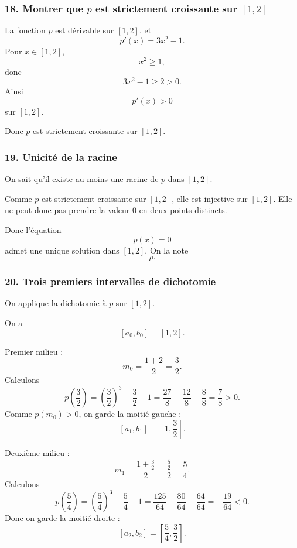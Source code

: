 \documentclass[11pt,a4paper]{article}
\begin{document}

\subsubsection*{18. Montrer que \(p\) est strictement croissante sur \([1,2]\)}

La fonction \(p\) est dérivable sur \([1,2]\), et
\[
p'(x)=3x^2-1.
\]
Pour \(x\in[1,2]\),
\[
x^2\geq1,
\]
donc
\[
3x^2-1\geq2>0.
\]
Ainsi
\[
p'(x)>0
\]
sur \([1,2]\).

Donc \(p\) est strictement croissante sur \([1,2]\).


\subsubsection*{19. Unicité de la racine}

On sait qu'il existe au moins une racine de \(p\) dans \([1,2]\).

Comme \(p\) est strictement croissante sur \([1,2]\), elle est injective sur \([1,2]\). Elle ne peut donc pas prendre la valeur \(0\) en deux points distincts.

Donc l'équation
\[
p(x)=0
\]
admet une unique solution dans \([1,2]\). On la note
\[
\rho.
\]


\subsubsection*{20. Trois premiers intervalles de dichotomie}

On applique la dichotomie à \(p\) sur \([1,2]\).

On a
\[
[a_0,b_0]=[1,2].
\]

Premier milieu :
\[
m_0=\frac{1+2}{2}=\frac32.
\]
Calculons
\[
p\left(\frac32\right)
=
\left(\frac32\right)^3-\frac32-1
=
\frac{27}{8}-\frac{12}{8}-\frac{8}{8}
=
\frac7{8}>0.
\]
Comme \(p(m_0)>0\), on garde la moitié gauche :
\[
[a_1,b_1]=\left[1,\frac32\right].
\]

Deuxième milieu :
\[
m_1=\frac{1+\frac32}{2}
=
\frac{\frac52}{2}
=
\frac54.
\]
Calculons
\[
p\left(\frac54\right)
=
\left(\frac54\right)^3-\frac54-1
=
\frac{125}{64}-\frac{80}{64}-\frac{64}{64}
=
-\frac{19}{64}<0.
\]
Donc on garde la moitié droite :
\[
[a_2,b_2]=\left[\frac54,\frac32\right].
\]
\end{document}
